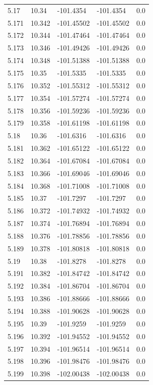 \begin{tabular}{lllll}
5.17 & 10.34 & -101.4354 & -101.4354 & 0.0 \\
5.171 & 10.342 & -101.45502 & -101.45502 & 0.0 \\
5.172 & 10.344 & -101.47464 & -101.47464 & 0.0 \\
5.173 & 10.346 & -101.49426 & -101.49426 & 0.0 \\
5.174 & 10.348 & -101.51388 & -101.51388 & 0.0 \\
5.175 & 10.35 & -101.5335 & -101.5335 & 0.0 \\
5.176 & 10.352 & -101.55312 & -101.55312 & 0.0 \\
5.177 & 10.354 & -101.57274 & -101.57274 & 0.0 \\
5.178 & 10.356 & -101.59236 & -101.59236 & 0.0 \\
5.179 & 10.358 & -101.61198 & -101.61198 & 0.0 \\
5.18 & 10.36 & -101.6316 & -101.6316 & 0.0 \\
5.181 & 10.362 & -101.65122 & -101.65122 & 0.0 \\
5.182 & 10.364 & -101.67084 & -101.67084 & 0.0 \\
5.183 & 10.366 & -101.69046 & -101.69046 & 0.0 \\
5.184 & 10.368 & -101.71008 & -101.71008 & 0.0 \\
5.185 & 10.37 & -101.7297 & -101.7297 & 0.0 \\
5.186 & 10.372 & -101.74932 & -101.74932 & 0.0 \\
5.187 & 10.374 & -101.76894 & -101.76894 & 0.0 \\
5.188 & 10.376 & -101.78856 & -101.78856 & 0.0 \\
5.189 & 10.378 & -101.80818 & -101.80818 & 0.0 \\
5.19 & 10.38 & -101.8278 & -101.8278 & 0.0 \\
5.191 & 10.382 & -101.84742 & -101.84742 & 0.0 \\
5.192 & 10.384 & -101.86704 & -101.86704 & 0.0 \\
5.193 & 10.386 & -101.88666 & -101.88666 & 0.0 \\
5.194 & 10.388 & -101.90628 & -101.90628 & 0.0 \\
5.195 & 10.39 & -101.9259 & -101.9259 & 0.0 \\
5.196 & 10.392 & -101.94552 & -101.94552 & 0.0 \\
5.197 & 10.394 & -101.96514 & -101.96514 & 0.0 \\
5.198 & 10.396 & -101.98476 & -101.98476 & 0.0 \\
5.199 & 10.398 & -102.00438 & -102.00438 & 0.0 \\

\end{tabular}

